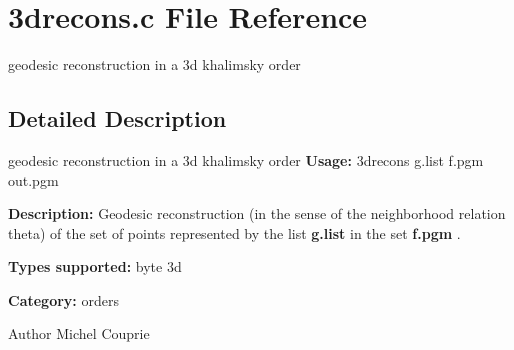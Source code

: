\section{3drecons.c File Reference}
\label{3drecons_8c}


geodesic reconstruction in a 3d khalimsky order  




\subsection{Detailed Description}
geodesic reconstruction in a 3d khalimsky order {\bfseries Usage:} 3drecons g.list f.pgm out.pgm

{\bfseries Description:} Geodesic reconstruction (in the sense of the neighborhood relation theta) of the set of points represented by the list {\bfseries g.list} in the set {\bfseries f.pgm} .

{\bfseries Types supported:} byte 3d

{\bfseries Category:} orders

\begin{DoxyAuthor}{Author}
Michel Couprie 
\end{DoxyAuthor}
